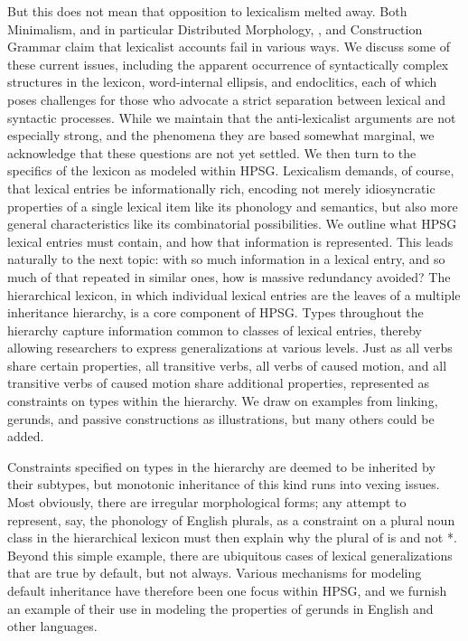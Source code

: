 \documentclass[output=paper]{langsci/langscibook}
\begin{document}
But this does not mean that opposition to lexicalism melted away.  Both Minimalism, and in particular Distributed Morphology, \citep{Bruening2018, Marantz1997}, and Construction Grammar \citep{Goldberg95a,Tomasello2003,vanTrijp2011} claim that lexicalist accounts fail in various ways.  We discuss some of these current issues, including the apparent occurrence of syntactically complex structures in the lexicon, word-internal ellipsis,  and endoclitics, each of which poses challenges for those who advocate a strict separation between lexical and syntactic processes.  While we maintain that the anti-lexicalist arguments are not especially strong, and the phenomena they are based somewhat marginal, we acknowledge that these questions are not yet settled. We then turn to the specifics of the lexicon as modeled within HPSG.  Lexicalism demands, of course, that lexical entries be informationally rich, encoding not merely idiosyncratic properties of a single lexical item like its phonology and semantics, but also more general characteristics like its combinatorial possibilities.  We outline what HPSG lexical entries must contain, and how that information is represented.  This leads naturally to the next topic: with so much information in a lexical entry, and so much of that repeated in similar ones, how is massive redundancy avoided?  The hierarchical lexicon, in which individual lexical entries are the leaves of a multiple inheritance hierarchy, is a core component of HPSG.  Types throughout the hierarchy capture information common to classes of lexical entries, thereby allowing researchers to express generalizations at various levels.  Just as all verbs share certain properties, all transitive verbs, all verbs of caused motion, and all transitive verbs of caused motion share additional properties, represented as constraints on types within the hierarchy.  We draw on examples from linking, gerunds, and passive constructions as illustrations, but many others could be added.

Constraints specified on types in the hierarchy are deemed to be inherited by their subtypes, but monotonic inheritance of this kind runs into vexing issues.  Most obviously, there are irregular morphological forms; any attempt to represent, say, the phonology of English plurals, as a constraint on a plural noun class in the hierarchical lexicon must then explain why the plural of  is  and not *.  Beyond this simple example, there are ubiquitous cases of lexical generalizations that are true by default, but not always.  Various mechanisms for modeling default inheritance have therefore been one focus within HPSG, and we furnish an example of their use in modeling the properties of gerunds in English and other languages.
\end{document}
